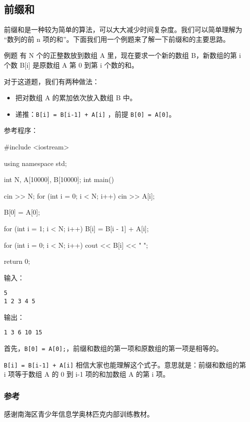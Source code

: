 
\subsection{前缀和}

前缀和是一种较为简单的算法，可以大大减少时间复杂度。我们可以简单理解为 “数列的前 n 项的和”。下面我们用一个例题来了解一下前缀和的主要思路。

\begin{NOTE}{例题}{}
有 N 个的正整数放到数组 A 里，现在要求一个新的数组 B，新数组的第 i 个数 B[i] 是原数组 A 第 0 到第 i 个数的和。

\end{NOTE}


对于这道题，我们有两种做法：

\begin{itemize}
\item 把对数组 A 的累加依次放入数组 B 中。
\item 递推：\texttt{B[i] = B[i-1] + A[i]} ，前提 \texttt{B[0] = A[0]}。
\end{itemize}

参考程序：

\begin{cppcode}
#include <iostream>

using namespace std;

int N, A[10000], B[10000];
int main() {
  cin >> N;
  for (int i = 0; i < N; i++) {
    cin >> A[i];
  }

  B[0] = A[0];

  for (int i = 1; i < N; i++) {
    B[i] = B[i - 1] + A[i];
  }

  for (int i = 0; i < N; i++) {
    cout << B[i] << " ";
  }

  return 0;
}
\end{cppcode}

输入：

\begin{verbatim}
5
1 2 3 4 5
\end{verbatim}

输出：

\begin{verbatim}
1 3 6 10 15 
\end{verbatim}

首先，\texttt{B[0] = A[0];}，前缀和数组的第一项和原数组的第一项是相等的。

\texttt{B[i] = B[i-1] + A[i]} 相信大家也能理解这个式子。意思就是：前缀和数组的第 i 项等于数组 A 的 0 到 i-1 项的和加数组 A 的第 i 项。

\subsubsection{参考}

感谢南海区青少年信息学奥林匹克内部训练教材。
